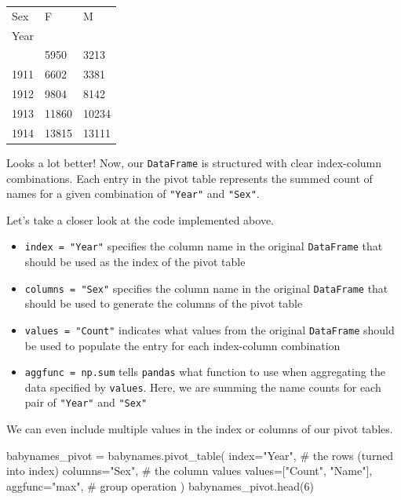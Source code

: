 \documentclass[
  letterpaper,
  DIV=11,
  numbers=noendperiod]{scrreprt}
\newenvironment{Shaded}{\begin{snugshade}}{\end{snugshade}}
\newcommand{\CommentTok}[1]{\textcolor[rgb]{0.37,0.37,0.37}{#1}}
\newcommand{\DecValTok}[1]{\textcolor[rgb]{0.68,0.00,0.00}{#1}}
\newcommand{\NormalTok}[1]{\textcolor[rgb]{0.00,0.23,0.31}{#1}}
\newcommand{\OperatorTok}[1]{\textcolor[rgb]{0.37,0.37,0.37}{#1}}
\newcommand{\StringTok}[1]{\textcolor[rgb]{0.13,0.47,0.30}{#1}}
\providecommand{\tightlist}{%
  \setlength{\itemsep}{0pt}\setlength{\parskip}{0pt}}\usepackage{longtable,booktabs,array}
\begin{document}
\begin{longtable}[]{@{}lll@{}}
\toprule\noalign{}
Sex & F & M \\
Year & & \\
\midrule\noalign{}
\endhead
\bottomrule\noalign{}
\endlastfoot
1910 & 5950 & 3213 \\
1911 & 6602 & 3381 \\
1912 & 9804 & 8142 \\
1913 & 11860 & 10234 \\
1914 & 13815 & 13111 \\
\end{longtable}

Looks a lot better! Now, our \texttt{DataFrame} is structured with clear
index-column combinations. Each entry in the pivot table represents the
summed count of names for a given combination of \texttt{"Year"} and
\texttt{"Sex"}.

Let's take a closer look at the code implemented above.

\begin{itemize}
\tightlist
\item
  \texttt{index\ =\ "Year"} specifies the column name in the original
  \texttt{DataFrame} that should be used as the index of the pivot table
\item
  \texttt{columns\ =\ "Sex"} specifies the column name in the original
  \texttt{DataFrame} that should be used to generate the columns of the
  pivot table
\item
  \texttt{values\ =\ "Count"} indicates what values from the original
  \texttt{DataFrame} should be used to populate the entry for each
  index-column combination
\item
  \texttt{aggfunc\ =\ np.sum} tells \texttt{pandas} what function to use
  when aggregating the data specified by \texttt{values}. Here, we are
  summing the name counts for each pair of \texttt{"Year"} and
  \texttt{"Sex"}
\end{itemize}

We can even include multiple values in the index or columns of our pivot
tables.

\begin{Shaded}
\begin{Highlighting}[]
\NormalTok{babynames\_pivot }\OperatorTok{=}\NormalTok{ babynames.pivot\_table(}
\NormalTok{    index}\OperatorTok{=}\StringTok{"Year"}\NormalTok{,     }\CommentTok{\# the rows (turned into index)}
\NormalTok{    columns}\OperatorTok{=}\StringTok{"Sex"}\NormalTok{,    }\CommentTok{\# the column values}
\NormalTok{    values}\OperatorTok{=}\NormalTok{[}\StringTok{"Count"}\NormalTok{, }\StringTok{"Name"}\NormalTok{], }
\NormalTok{    aggfunc}\OperatorTok{=}\StringTok{"max"}\NormalTok{,      }\CommentTok{\# group operation}
\NormalTok{)}
\NormalTok{babynames\_pivot.head(}\DecValTok{6}\NormalTok{)}
\end{Highlighting}
\end{Shaded}
\end{document}
